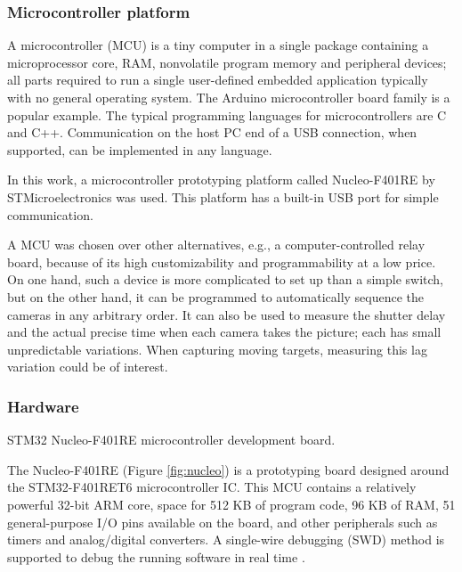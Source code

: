 \subsubsection{Microcontroller platform}

A microcontroller (MCU) is a tiny computer in a single package containing a microprocessor core, RAM, nonvolatile program memory and peripheral devices; all parts required to run a single user-defined embedded application typically with no general operating system.
The Arduino microcontroller board family \cite{arduino} is a popular example.
The typical programming languages for microcontrollers are C and C++.
Communication on the host PC end of a USB connection, when supported, can be implemented in any language.

In this work, a microcontroller prototyping platform called Nucleo-F401RE by STMicroelectronics \cite{stnucleo} was used.
This platform has a built-in USB port for simple communication.

A MCU was chosen over other alternatives, e.g., a computer-controlled relay board, because of its high customizability and programmability at a low price.
On one hand, such a device is more complicated to set up than a simple switch, but on the other hand, it can be programmed to automatically sequence the cameras in any arbitrary order.
It can also be used to measure the shutter delay and the actual precise time when each camera takes the picture; each has small unpredictable variations.
When capturing moving targets, measuring this lag variation could be of interest.

\subsubsection{Hardware}

{STM32 Nucleo-F401RE microcontroller development board.}

The Nucleo-F401RE (Figure \ref{fig:nucleo}) is a prototyping board designed around the STM32-F401RET6 microcontroller IC.
This MCU contains a relatively powerful 32-bit ARM core, space for 512 KB of program code, 96 KB of RAM, 51 general-purpose I/O pins available on the board, and other peripherals such as timers and analog/digital converters.
A single-wire debugging (SWD) method is supported to debug the running software in real time \cite{stnucleo}.

